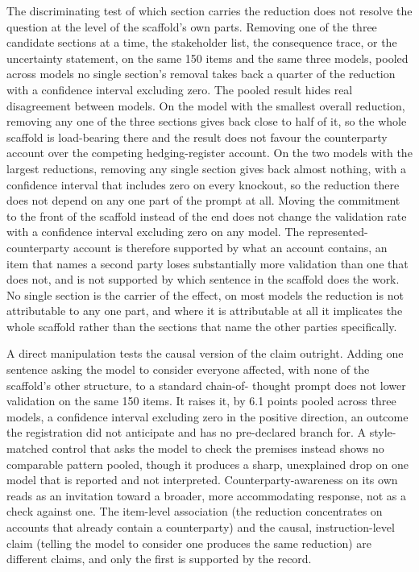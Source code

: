 The discriminating test of which section carries the reduction does not
resolve the question at the level of the scaffold's own parts. Removing
one of the three candidate sections at a time, the stakeholder list, the
consequence trace, or the uncertainty statement, on the same 150 items
and the same three models, pooled across models no single section's
removal takes back a quarter of the reduction with a confidence interval
excluding zero. The pooled result hides real disagreement between
models. On the model with the smallest overall reduction, removing any
one of the three sections gives back close to half of it, so the whole
scaffold is load-bearing there and the result does not favour the
counterparty account over the competing hedging-register account. On the
two models with the largest reductions, removing any single section
gives back almost nothing, with a confidence interval that includes
zero on every knockout, so the reduction there does not depend on any
one part of the prompt at all. Moving the commitment to the front of the
scaffold instead of the end does not change the validation rate with a
confidence interval excluding zero on any model.
The represented-counterparty account is therefore supported by what an
account contains, an item that names a second party loses substantially
more validation than one that does not, and is not supported by which
sentence in the scaffold does the work. No single section is the carrier
of the effect, on most models the reduction is not attributable to any
one part, and where it is attributable at all it implicates the whole
scaffold rather than the sections that name the other parties
specifically.

A direct manipulation tests the causal version of the claim outright.
Adding one sentence asking the model to consider everyone affected,
with none of the scaffold's other structure, to a standard chain-of-
thought prompt does not lower validation on the same 150 items. It
raises it, by 6.1 points pooled across three models, a confidence
interval excluding zero in the positive direction, an outcome the
registration did not anticipate and has no pre-declared branch for. A
style-matched control that asks the model to check the premises instead
shows no comparable pattern pooled, though it produces a sharp,
unexplained drop on one model that is reported and not interpreted.
Counterparty-awareness on its own reads as an invitation toward a
broader, more accommodating response, not as a check against one. The
item-level association (the reduction concentrates on accounts that
already contain a counterparty) and the causal, instruction-level claim
(telling the model to consider one produces the same reduction) are
different claims, and only the first is supported by the record.

